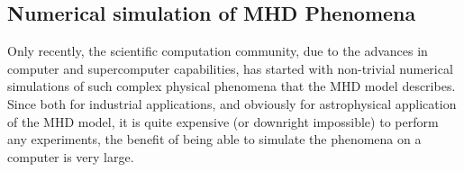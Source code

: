 \subsection{Numerical simulation of MHD Phenomena}
Only recently, the scientific computation community, due to the advances in computer and supercomputer capabilities, has started with non-trivial numerical simulations of such complex physical phenomena that the MHD model describes. Since both for industrial applications, and obviously for astrophysical application of the MHD model, it is quite expensive (or downright impossible) to perform any experiments, the benefit of being able to simulate the phenomena on a computer is very large.